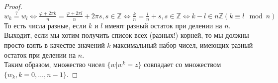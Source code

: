 \begin{normalsize}
\begin{proof}
    $w_k \stackrel{?}{=} w_l \Leftrightarrow \frac{\varphi + 2\pi k}{n} = \frac{\varphi + 2\pi l}{n} + 2\pi s, s\in\mathbb{Z} \Leftrightarrow \frac{k}{n} = \frac{l}{n} + s, s\in\mathbb{Z} \Leftrightarrow k-l \in n\mathbb{Z} (k \equiv l \mod n)$ \\ 

    То есть числа разные, если $k$ и $l$ имеют разный остаток при делении на $n$. Выходит, если мы хотим получить список всех (разных!) корней, то мы должны просто взять в качестве значений $k$ максимальный набор чисел, имеющих разный остаток при делении на $n$. \\

    Таким образом, множество чисел $\{ w | w^k = z\}$ совпадает со множеством $\{ w_k, k=0, \dots, n-1 \}.$
  \end{proof}
\end{normalsize}